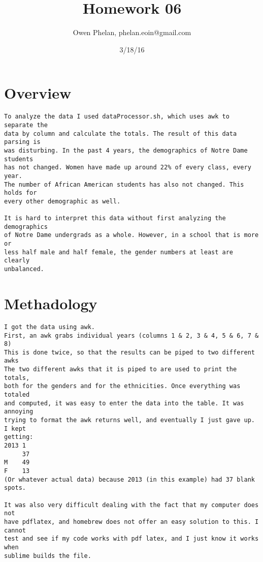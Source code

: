 \documentclass{article}
\title{Homework 06}
\date{3/18/16}
\author{Owen Phelan, phelan.eoin@gmail.com}
\begin{document}
	\maketitle
	\section{Overview}
	\begin{verbatim}
To analyze the data I used dataProcessor.sh, which uses awk to separate the 
data by column and calculate the totals. The result of this data parsing is 
was disturbing. In the past 4 years, the demographics of Notre Dame students 
has not changed. Women have made up around 22% of every class, every year. 
The number of African American students has also not changed. This holds for
every other demographic as well. 

It is hard to interpret this data without first analyzing the demographics
of Notre Dame undergrads as a whole. However, in a school that is more or 
less half male and half female, the gender numbers at least are clearly 
unbalanced. 

	\end{verbatim}
	\section{Methadology}
	\begin{verbatim}
I got the data using awk. 
First, an awk grabs individual years (columns 1 & 2, 3 & 4, 5 & 6, 7 & 8)
This is done twice, so that the results can be piped to two different awks
The two different awks that it is piped to are used to print the totals, 
both for the genders and for the ethnicities. Once everything was totaled 
and computed, it was easy to enter the data into the table. It was annoying
trying to format the awk returns well, and eventually I just gave up. I kept
getting:
2013 1
	 37
M    49
F    13
(Or whatever actual data) because 2013 (in this example) had 37 blank spots.

It was also very difficult dealing with the fact that my computer does not 
have pdflatex, and homebrew does not offer an easy solution to this. I cannot
test and see if my code works with pdf latex, and I just know it works when
sublime builds the file. 

	\end{verbatim}
	\newpage
\end{document}
